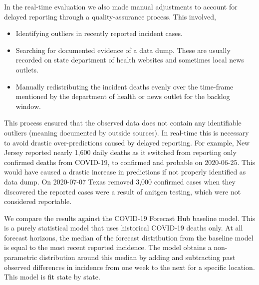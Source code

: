 \documentclass{umassthesis}          %
\begin{document}
 In the real-time evaluation we also made manual adjustments to account for delayed reporting through a quality-assurance process. This involved,
 
 \begin{itemize}
 \item Identifying outliers in recently reported incident cases.
 \item Searching for documented evidence of a data dump. These are usually recorded on state department of health websites and sometimes local news outlets.
 \item Manually redistributing the incident deaths evenly over the time-frame mentioned by the department of health or news outlet for the backlog window.
 \end{itemize}
 
 
 This process ensured that the observed data does not contain any identifiable outliers (meaning documented by outside sources). In real-time this is necessary to avoid drastic over-predictions caused by delayed reporting. For example, New Jersey reported nearly 1,600 daily deaths as it switched from reporting only confirmed deaths from COVID-19, to confirmed and probable on 2020-06-25. This would have caused a drastic increase in predictions if not properly identified as data dump. On 2020-07-07 Texas removed 3,000 confirmed cases when they discovered the reported cases were a result of anitgen testing, which were not considered reportable. 
 
 We compare the results against the COVID-19 Forecast Hub baseline model. This is a purely statistical model that uses historical COVID-19 deaths only. At all forecast horizons, the median of the forecast distribution from the baseline model is equal to the most recent reported incidence. The model obtains a non-parametric distribution around this median by adding and subtracting past observed differences in incidence from one week to the next for a specific location. This model is fit state by state. 
   
\end{document}
